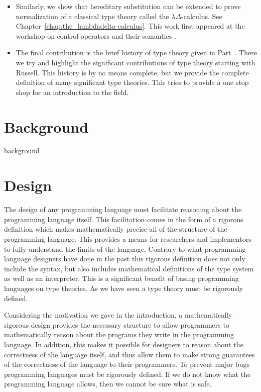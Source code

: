 \documentclass[phd,appendix,dedicationpage,ackpage,epigraphpage]{uithesis}
\begin{document}
\begin{itemize}
\item Similarly, we show that hereditary substitution can be extended
  to prove normalization of a classical type theory called the
  $\lambda\Delta$-calculus. See
  Chapter~\ref{chap:the_lambdadelta-calculus}.  This work first
  appeared at the workshop on control operators and their semantics
  \cite{Eades:2013}.

\item The final contribution is the brief history of type theory given
  in Part~\ref{part:background}.  There we try and highlight the
  significant contributions of type theory starting with Russell.
  This history is by no means complete, but we provide the complete
  definition of many significant type theories.  This tries to provide
  a one stop shop for an introduction to the field.
\end{itemize}

\part{Background}          
\label{part:background}
{background}

\part{Design}
\label{part:design}
The design of any programming language must facilitate reasoning about
the programming language itself.  This facilitation comes in the form
of a rigorous definition which makes mathematically precise all of the
structure of the programming language.  This provides a means for
researchers and implementors to fully understand the limits of the
language.  Contrary to what programming language designers have done
in the past this rigorous definition does not only include the syntax,
but also includes mathematical definitions of the type system as well
as an interpreter. This is a significant benefit of basing programming
languages on type theories.  As we have seen a type theory must be
rigorously defined.  

Considering the motivation we gave in the introduction, a
mathematically rigorous design provides the necessary structure to
allow programmers to mathematically reason about the programs they
write in the programming language.  In addition, this makes it
possible for designers to reason about the correctness of the language
itself, and thus allow them to make strong guarantees of the
correctness of the language to their programmers.  To prevent major
bugs programming languages must be rigorously defined.  If we do not
know what the programming language allows, then we cannot be sure what
is safe.
\end{document}

